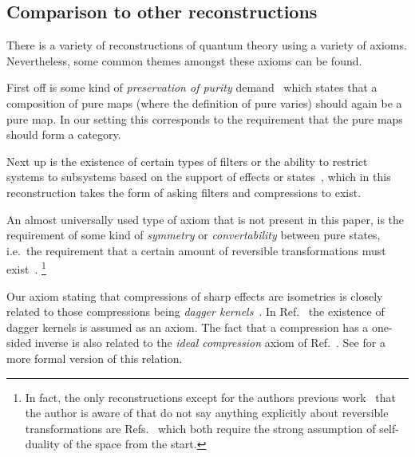 \documentclass[a4paper,onecolumn,10pt,accepted=2019-05-03, issue=1, volume=1, shorttitle=papers/compositionality-1-1]{compositionalityarticle}
\numberwithin{counter}{section}
\begin{document}
\subsection{Comparison to other reconstructions}
There is a variety of reconstructions of quantum theory using a variety of axioms. Nevertheless, some common themes amongst these axioms can be found. 

First off is some kind of \emph{preservation of purity} demand~\cite{chiribella2015operational,barnum2014higher,hardy2011reformulating,gunson1967algebraic,tull2016reconstruction,selby2018reconstructing} which states that a composition of pure maps (where the definition of pure varies) should again be a pure map. In our setting this corresponds to the requirement that the pure maps should form a category.

Next up is the existence of certain types of filters or the ability to restrict systems to subsystems based on the support of effects or states~\cite{chiribella2011informational,hardy2011reformulating,wilce2018royal,tull2016reconstruction,barnum2014higher,gunson1967algebraic}, which in this reconstruction takes the form of asking filters and compressions to exist.

An almost universally used type of axiom that is not present in this paper, is the requirement of some kind of \emph{symmetry} or \emph{convertability} between pure states, i.e.\ the requirement that a certain amount of reversible transformations must exist~\cite{barnum2014higher,hardy2001quantum,hardy2011reformulating,dakic2009quantum,masanes2014entanglement,krumm2017thermodynamics,chiribella2011informational,tull2016reconstruction,selby2018reconstructing,hohn2017toolbox}. \footnote{In fact, the only reconstructions except for the authors previous work~\cite{wetering2018sequential} that the author is aware of that do not say anything explicitly about reversible transformations are Refs.~\cite{gunson1967algebraic,wilce2018royal} which both require the strong assumption of self-duality of the space from the start.}

Our axiom stating that compressions of sharp effects are isometries is closely related to those compressions being \emph{dagger kernels}~\cite{heunen2010quantum}. In Ref.~\cite{tull2016reconstruction} the existence of dagger kernels is assumed as an axiom. The fact that a compression has a one-sided inverse is also related to the \emph{ideal compression} axiom of Ref.~\cite{chiribella2011informational}. See \cite[Theorem 4.21]{tull2019phdthesis} for a more formal version of this relation.
\end{document}
